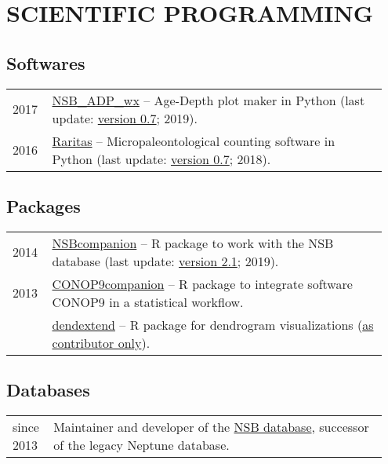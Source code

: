 \documentclass[11pt, a4paper]{article}
\begin{document}
\section{SCIENTIFIC PROGRAMMING}
\subsection{Softwares}
\begin{longtable}{p{0.1\linewidth} P{0.85\linewidth}}
2017 & \href{http://github.com/plannapus/NSB_ADP_wx/releases}{NSB\_ADP\_wx} -- Age-Depth plot maker in Python (last update: \href{http://doi.org/10.5281/zenodo.3408657}{version 0.7}; 2019).\\
2016 & \href{http://github.com/plannapus/Raritas/releases}{Raritas} -- Micropaleontological counting software in Python (last update: \href{https://github.com/plannapus/Raritas/releases/tag/v0.7}{version 0.7}; 2018).\\
\end{longtable}
\subsection{Packages}
\begin{longtable}{p{0.1\linewidth} P{0.85\linewidth}}
2014 & \href{http://github.com/plannapus/NSBcompanion}{NSBcompanion} -- R package to work with the NSB database (last update: \href{http://doi.org/10.5281/zenodo.3408198}{version 2.1}; 2019).\\
2013 & \href{http://github.com/plannapus/CONOP9companion}{CONOP9companion} -- R package to integrate software CONOP9 in a statistical workflow.\\
     & \href{https://cran.r-project.org/web/packages/dendextend/index.html}{dendextend} -- R package for dendrogram visualizations (\underline{as contributor only}).\\
\end{longtable}
\subsection{Databases}
\begin{longtable}{p{0.1\linewidth} P{0.85\linewidth}}
since 2013 & Maintainer and developer of the \href{http://nsb-mfn-berlin.de/}{NSB database}, successor of the legacy Neptune database.\\
\end{longtable}
\end{document}
